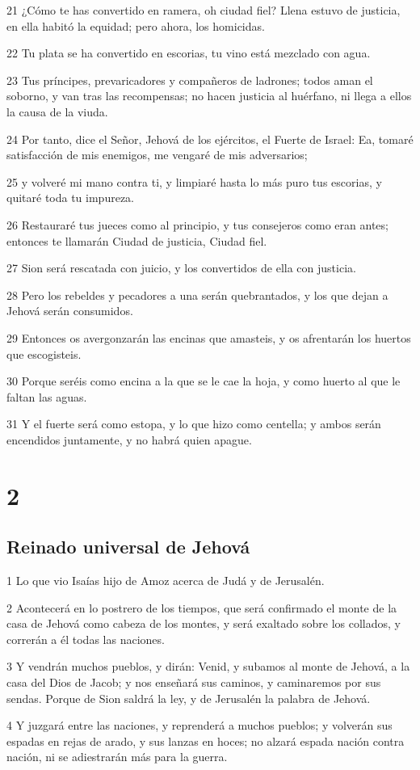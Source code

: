 \par 21 ¿Cómo te has convertido en ramera, oh ciudad fiel? Llena estuvo de justicia, en ella habitó la equidad; pero ahora, los homicidas.
\par 22 Tu plata se ha convertido en escorias, tu vino está mezclado con agua.
\par 23 Tus príncipes, prevaricadores y compañeros de ladrones; todos aman el soborno, y van tras las recompensas; no hacen justicia al huérfano, ni llega a ellos la causa de la viuda.
\par 24 Por tanto, dice el Señor, Jehová de los ejércitos, el Fuerte de Israel: Ea, tomaré satisfacción de mis enemigos, me vengaré de mis adversarios;
\par 25 y volveré mi mano contra ti, y limpiaré hasta lo más puro tus escorias, y quitaré toda tu impureza.
\par 26 Restauraré tus jueces como al principio, y tus consejeros como eran antes; entonces te llamarán Ciudad de justicia, Ciudad fiel.
\par 27 Sion será rescatada con juicio, y los convertidos de ella con justicia.
\par 28 Pero los rebeldes y pecadores a una serán quebrantados, y los que dejan a Jehová serán consumidos.
\par 29 Entonces os avergonzarán las encinas que amasteis, y os afrentarán los huertos que escogisteis.
\par 30 Porque seréis como encina a la que se le cae la hoja, y como huerto al que le faltan las aguas.
\par 31 Y el fuerte será como estopa, y lo que hizo como centella; y ambos serán encendidos juntamente, y no habrá quien apague.

\chapter{2}

\section*{Reinado universal de Jehová}

\par 1 Lo que vio Isaías hijo de Amoz acerca de Judá y de Jerusalén.
\par 2 Acontecerá en lo postrero de los tiempos, que será confirmado el monte de la casa de Jehová como cabeza de los montes, y será exaltado sobre los collados, y correrán a él todas las naciones.
\par 3 Y vendrán muchos pueblos, y dirán: Venid, y subamos al monte de Jehová, a la casa del Dios de Jacob; y nos enseñará sus caminos, y caminaremos por sus sendas. Porque de Sion saldrá la ley, y de Jerusalén la palabra de Jehová.
\par 4 Y juzgará entre las naciones, y reprenderá a muchos pueblos; y volverán sus espadas en rejas de arado, y sus lanzas en hoces; no alzará espada nación contra nación, ni se adiestrarán más para la guerra.

